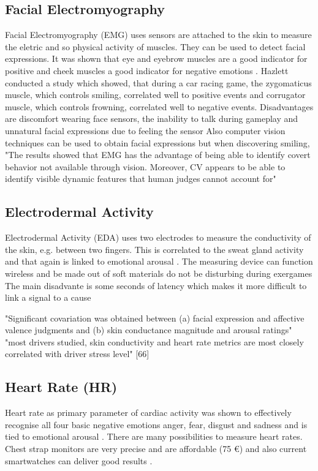 \subsection{Facial Electromyography}
Facial Electromyography (EMG) uses sensors are attached to the skin to measure the eletric and so physical activity of muscles. They can be used to detect facial expressions. It was shown that eye \cite{ravaja2018phasic} and eyebrow muscles are a good indicator for positive and cheek muscles a good indicator for negative emotions \cite{nacke2015physiological,mandryk2006using}.
Hazlett conducted a study which showed, that during a car racing game, the zygomaticus muscle, which controls smiling, correlated well to positive events and corrugator muscle, which controls frowning, correlated well to negative events.
\cite{hazlett2006measuring}
Disadvantages are discomfort wearing face sensors, the inability to talk during gameplay and unnatural facial expressions due to feeling the sensor \cite{nacke2015physiological}
Also computer vision techniques can be used to obtain facial expressions but when discovering smiling, "The results showed that EMG has the advantage of
being able to identify covert behavior not available through
vision. Moreover, CV appears to be able to identify visible
dynamic features that human judges cannot account for" \cite{hernandez19invisible}

\subsection{Electrodermal Activity}
Electrodermal Activity (EDA) uses two electrodes to measure the conductivity of the skin, e.g. between two fingers. This is correlated to the sweat gland activity and that again is linked to emotional arousal \cite{nacke2015physiological, dawson2017electrodermal}. The measuring device can function wireless and be made out of soft materials \cite{kim2021soft} do not be disturbing during exergames 
The main disadvante is some seconds of latency which makes it more difficult to link a signal to a cause \cite{nacke2015physiological} 

"Significant covariation was obtained between (a) facial expression and affective valence judgments and (b) skin conductance magnitude and arousal ratings" \cite{lang93pictures}
"most drivers studied, skin conductivity and heart rate metrics are most closely correlated with driver stress level" [66]


\subsection{Heart Rate (HR)}
Heart rate as primary parameter of cardiac activity was shown to effectively recognise all four basic negative emotions anger, fear, disgust and sadness \cite{levenson2003blood} and is tied to emotional arousal \cite{nacke2015physiological}. There are many possibilities to measure heart rates. Chest strap monitors are very precise and are affordable (75 €) \cite{link_herzfrequenzsensor} and also current smartwatches can deliver good results \cite{gillinov2017variable}.

